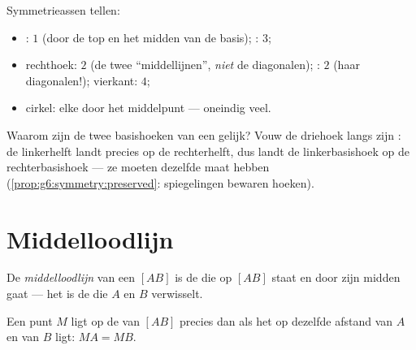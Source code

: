 \begin{example}\label{ex:g6:symmetry:shapes}
Symmetrieassen tellen:
\begin{itemize}
  \item {}: $1$ (door de top en het midden van de basis);
        : $3$;
  \item rechthoek: $2$ (de twee ``middellijnen'', \emph{niet} de diagonalen);
        : $2$ (haar diagonalen!); vierkant: $4$;
  \item cirkel: elke  door het middelpunt --- oneindig veel.
\end{itemize}
\end{example}

\begin{example}\label{ex:g6:symmetry:proves}
Waarom zijn de twee basishoeken van een  gelijk? Vouw de
driehoek langs zijn : de linkerhelft landt precies op de
rechterhelft, dus landt de linkerbasishoek op de rechterbasishoek --- ze moeten
dezelfde maat hebben (\cref{prop:g6:symmetry:preserved}: spiegelingen bewaren
hoeken).
\end{example}

\section{Middelloodlijn}

\begin{definition}[Middelloodlijn]\label{def:g6:symmetry:bisector}
De \emph{middelloodlijn} van een  $[AB]$ is de
 die  op $[AB]$ staat en door zijn midden gaat --- het is de
 die $A$ en $B$ verwisselt.
\end{definition}

\begin{proposition}\label{prop:g6:symmetry:bisector}
Een punt $M$ ligt op de  van $[AB]$ precies dan als het op
dezelfde afstand van $A$ en van $B$ ligt: $MA = MB$.
\end{proposition}
\admitted

